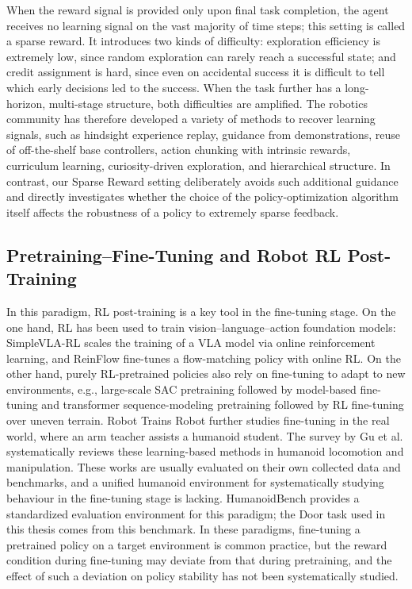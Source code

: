 When the reward signal is provided only upon final task completion, the agent receives no learning signal on the vast majority of time steps; this setting is called a sparse reward\cite{andrychowicz2017hindsight}. It introduces two kinds of difficulty: exploration efficiency is extremely low, since random exploration can rarely reach a successful state\cite{wang2022learning}; and credit assignment is hard, since even on accidental success it is difficult to tell which early decisions led to the success\cite{yang2026actor}. When the task further has a long-horizon, multi-stage structure, both difficulties are amplified\cite{wang2022learning,yang2026actor}. The robotics community has therefore developed a variety of methods to recover learning signals, such as hindsight experience replay\cite{andrychowicz2017hindsight}, guidance from demonstrations\cite{vecerik2017leveraging}, reuse of off-the-shelf base controllers\cite{wang2022learning}, action chunking with intrinsic rewards\cite{yang2026actor}, curriculum learning\cite{xie2020learning}, curiosity-driven exploration\cite{hare2019dealing,schwarke2023curiosity}, and hierarchical structure\cite{hansen2025hierarchical}. In contrast, our Sparse Reward setting deliberately avoids such additional guidance and directly investigates whether the choice of the policy-optimization algorithm itself affects the robustness of a policy to extremely sparse feedback.

\subsection{Pretraining--Fine-Tuning and Robot RL Post-Training}

In this paradigm, RL post-training is a key tool in the fine-tuning stage. On the one hand, RL has been used to train vision--language--action foundation models: SimpleVLA-RL\cite{li2026simplevla} scales the training of a VLA model via online reinforcement learning, and ReinFlow\cite{zhang2026reinflow} fine-tunes a flow-matching policy with online RL. On the other hand, purely RL-pretrained policies also rely on fine-tuning to adapt to new environments, e.g., large-scale SAC pretraining followed by model-based fine-tuning\cite{huang2026towards} and transformer sequence-modeling pretraining followed by RL fine-tuning over uneven terrain\cite{radosavovic2024learning}. Robot Trains Robot\cite{hu2025robot} further studies fine-tuning in the real world, where an arm teacher assists a humanoid student. The survey by Gu et al.\cite{gu2026humanoid} systematically reviews these learning-based methods in humanoid locomotion and manipulation. These works are usually evaluated on their own collected data and benchmarks, and a unified humanoid environment for systematically studying behaviour in the fine-tuning stage is lacking. HumanoidBench\cite{sferrazza2024humanoidbench} provides a standardized evaluation environment for this paradigm; the Door task used in this thesis comes from this benchmark. In these paradigms, fine-tuning a pretrained policy on a target environment is common practice, but the reward condition during fine-tuning may deviate from that during pretraining, and the effect of such a deviation on policy stability has not been systematically studied.

